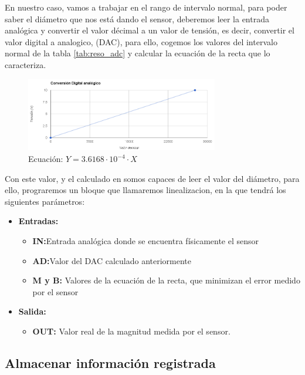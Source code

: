 En nuestro caso, vamos a trabajar en el rango de intervalo normal, para poder saber el diámetro que nos está dando el sensor, deberemos leer la entrada analógica y convertir el valor décimal a un valor de tensión, es decir, convertir el valor digital a analogico, (DAC), para ello, cogemos los valores del intervalo normal de la tabla \ref{tab:reso_adc} y calcular la ecuación de la recta que lo caracteriza.

    \begin{figure}[H]
            \centering
            \includegraphics[width=0.75\textwidth]{images/PLC/image.png}
            \caption{Ecuación: $Y=3.6168 \cdot 10^{-4} \cdot X$}
            \label{fig:plc_DAC}
    \end{figure}

Con este valor, y el calculado en \pageref{fig:sens_regre} somos capaces de leer el valor del diámetro, para ello, prograremos un bloque que llamaremos linealizacion, en la que tendrá los siguientes parámetros:

\begin{itemize}
    \item{\textbf{Entradas:}}
        \begin{itemize}
            \item{\textbf{IN:}Entrada analógica donde se encuentra físicamente el sensor}
            \item{\textbf{AD:}Valor del DAC calculado anteriormente}
            \item{\textbf{M y B:} Valores de la ecuación de la recta, que minimizan el error medido por el sensor}         
        \end{itemize}
    \item{\textbf{Salida:}}
        \begin{itemize}
            \item{\textbf{OUT:} Valor real de la magnitud medida por el sensor.}
        \end{itemize}
\end{itemize}

\subsection{Almacenar información registrada}
\label{sec:plc_SD}

